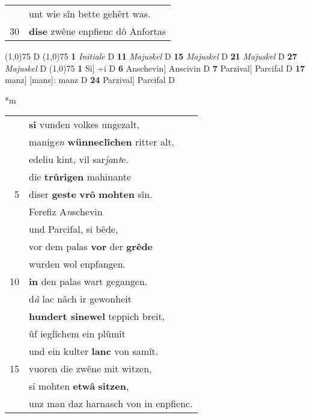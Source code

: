 \documentclass[8pt,a4paper,notitlepage]{article}
\begin{document}
\begin{table}[ht]
\begin{minipage}[t]{0.5\linewidth}
\begin{tabular}{rl}
 & unt wie sîn bette gehêrt was.\\ 
30 & \textbf{dise} zwêne enpfienc dô Anfortas\\ 
\end{tabular}
\scriptsize
\line(1,0){75} \newline
D \newline
\line(1,0){75} \newline
\textbf{1} \textit{Initiale} D  \textbf{11} \textit{Majuskel} D  \textbf{15} \textit{Majuskel} D  \textbf{21} \textit{Majuskel} D  \textbf{27} \textit{Majuskel} D  \newline
\line(1,0){75} \newline
\textbf{1} Si] ÷i D \textbf{6} Anschevin] Anscivin D \textbf{7} Parzival] Parcifal D \textbf{17} manz] [mans]: manz D \textbf{24} Parzival] Parcifal D \newline
\end{minipage}
\hspace{0.5cm}
\begin{minipage}[t]{0.5\linewidth}
\small
\begin{center}*m
\end{center}
\begin{tabular}{rl}
 & \textbf{si} vunden volkes ungezalt,\\ 
 & manig\textit{en} \textbf{wünneclîchen} ritter alt,\\ 
 & edeliu kint, vil sar\textit{ja}n\textit{t}e.\\ 
 & die \textbf{trûrigen} mahinante\\ 
5 & diser \textbf{geste} \textbf{vrô} \textbf{mohten} sîn.\\ 
 & Ferefiz A\textit{n}schevin\\ 
 & und Parcifal, si bêde,\\ 
 & vor dem palas \textbf{vor} der \textbf{grêde}\\ 
 & wurden wol enpfangen.\\ 
10 & \textbf{in} den palas wart gegangen.\\ 
 & d\textit{â} lac nâch ir gewonheit\\ 
 & \textbf{hundert sinewel} teppich breit,\\ 
 & ûf ieglîchem ein plûmît\\ 
 & und ein kulter \textbf{lanc} von samît.\\ 
15 & vuoren die zwêne mit witzen,\\ 
 & si mohten \textbf{etwâ} \textbf{sitzen},\\ 
 & unz man daz harnasch von in enpfienc.\\ 

\end{tabular}
\end{minipage}
\end{table}
\end{document}
